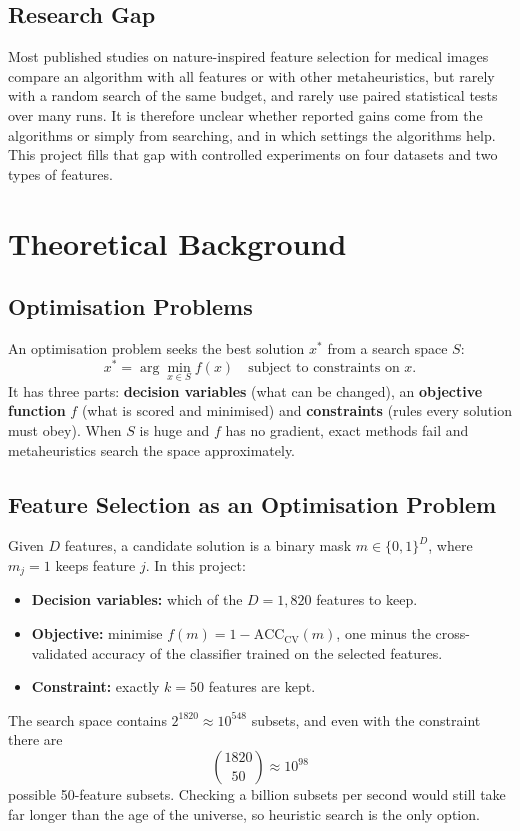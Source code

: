 \documentclass[12pt,a4paper]{report}
\begin{document}
\section{Research Gap}
Most published studies on nature-inspired feature selection for medical images compare an algorithm with all
features or with other metaheuristics, but rarely with a random search of the same budget, and rarely use paired
statistical tests over many runs. It is therefore unclear whether reported gains come from the algorithms or simply
from searching, and in which settings the algorithms help. This project fills that gap with controlled experiments
on four datasets and two types of features.

\chapter{Theoretical Background}

\section{Optimisation Problems}
An optimisation problem seeks the best solution $x^\ast$ from a search space $S$:
\begin{equation}
x^\ast = \arg\min_{x \in S} f(x) \quad \text{subject to constraints on } x .
\end{equation}
It has three parts: \textbf{decision variables} (what can be changed), an \textbf{objective function} $f$ (what is
scored and minimised) and \textbf{constraints} (rules every solution must obey). When $S$ is huge and $f$ has no
gradient, exact methods fail and metaheuristics search the space approximately.

\section{Feature Selection as an Optimisation Problem}
Given $D$ features, a candidate solution is a binary mask $m \in \{0,1\}^D$, where $m_j = 1$ keeps feature $j$. In
this project:
\begin{itemize}
  \item \textbf{Decision variables:} which of the $D = 1{,}820$ features to keep.
  \item \textbf{Objective:} minimise $f(m) = 1 - \mathrm{ACC}_{\mathrm{CV}}(m)$, one minus the cross-validated
        accuracy of the classifier trained on the selected features.
  \item \textbf{Constraint:} exactly $k = 50$ features are kept.
\end{itemize}
The search space contains $2^{1820} \approx 10^{548}$ subsets, and even with the constraint there are
\begin{equation}
\binom{1820}{50} \approx 10^{98}
\end{equation}
possible 50-feature subsets. Checking a billion subsets per second would still take far longer than the age of the
universe, so heuristic search is the only option.
\end{document}
